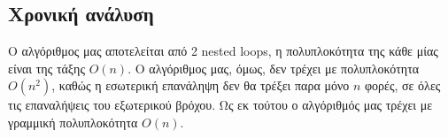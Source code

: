 \documentclass[11pt]{article}
\begin{document}
\subsection{Χρονική ανάλυση}
\label{sec:org7cb1afe}
Ο αλγόριθμος μας αποτελείται από 2 nested loops, η πολυπλοκότητα της κάθε μίας
είναι της τάξης \(O(n)\). Ο αλγόριθμος μας, όμως, δεν τρέχει με πολυπλοκότητα
\(O(n^2)\), καθώς η εσωτερική επανάληψη δεν θα τρέξει παρα μόνο \(n\) φορές, σε όλες
τις επαναλήψεις του εξωτερικού βρόχου. Ως εκ τούτου ο αλγόριθμός μας τρέχει με γραμμική
πολυπλοκότητα \(O(n)\). 
\end{document}
